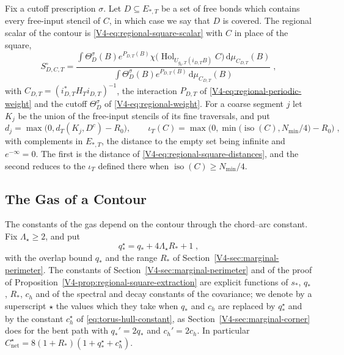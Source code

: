 \documentclass[11pt]{article}
\newcommand{\dd}{\mathrm{d}}
\newcommand{\Hol}{\operatorname{Hol}}
\newcommand{\iso}{\operatorname{iso}}
\numberwithin{equation}{section}
\theoremstyle{remark}
\theoremstyle{plain}
\begin{document}
Fix a cutoff prescription $\sigma$. Let $D\subseteq E_{*,T}$ be a set of free bonds which contains every free-input stencil of $C$, in which case we say that $D$ is covered. The regional scalar of the contour is \eqref{V4-eq:regional-square-scalar} with $C$ in place of the square,
\begin{equation}\label{eq:torus-regional-scalar}
    S^{\circ}_{D,C,T}=
    \frac{\displaystyle\int\Theta_D^{\sigma}(B)e^{P_{D,T}(B)}
        \chi\bigl(\Hol_{U_{g_0,T}(i_{D,T}B)}C\bigr)\,\dd\mu_{C_{D,T}}(B)}
    {\displaystyle\int\Theta_D^{\sigma}(B)e^{P_{D,T}(B)}\,\dd\mu_{C_{D,T}}(B)}\;,
\end{equation}
with $C_{D,T}=(i_{D,T}^*H_Ti_{D,T})^{-1}$, the interaction $P_{D,T}$ of \eqref{V4-eq:regional-periodic-weight} and the cutoff $\Theta^{\sigma}_D$ of \eqref{V4-eq:regional-weight}. For a coarse segment $j$ let $K_j$ be the union of the free-input stencils of its fine traversals, and put
\begin{equation}\label{eq:torus-distances}
    d_j=\max\bigl(0,d_T(K_j,D^c)-R_0\bigr),
    \qquad \iota_T(C)=\max\bigl(0,\min\bigl(\iso(C),N_{\min}/4\bigr)-R_0\bigr)\;,
\end{equation}
with complements in $E_{*,T}$, the distance to the empty set being infinite and $e^{-\infty}=0$. The first is the distance of \eqref{V4-eq:regional-square-distances}, and the second reduces to the $\iota_T$ defined there when $\iso(C)\geqslant N_{\min}/4$.

\subsection{The Gas of a Contour}\label{sec:torus-gas}

The constants of the gas depend on the contour through the chord--arc constant. Fix $\Lambda_{\star}\geqslant 2$, and put
\begin{equation}\label{eq:torus-label-constant}
    q_*^{\star}= q_*+4\Lambda_{\star}R_*+1\;,
\end{equation}
with the overlap bound $q_*$ and the range $R_*$ of Section~\ref{V4-sec:marginal-perimeter}. The constants of Section~\ref{V4-sec:marginal-perimeter} and of the proof of Proposition~\ref{V4-prop:regional-square-extraction} are explicit functions of $s_*$, $q_*$, $R_*$, $c_h$ and of the spectral and decay constants of the covariance; we denote by a superscript $\star$ the values which they take when $q_*$ and $c_h$ are replaced by $q_*^{\star}$ and by the constant $c_h^{\star}$ of \eqref{eq:torus-hull-constant}, as Section~\ref{V4-sec:marginal-corner} does for the bent path with $q_*'=2q_*$ and $c_h'=2c_h$. In particular $C_{\mathrm{net}}^{\star}=8(1+R_*)(1+q_*^{\star}+c_h^{\star})$.
\end{document}
